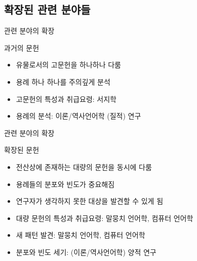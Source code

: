 \documentclass[11pt, aspectratio=169]{beamer}
\begin{document}
\subsection{확장된 관련 분야들}

\begin{frame}[t]{관련 분야의 확장}
  \begin{block}{과거의 문헌}
    \begin{itemize}
      \item 유물로서의 고문헌을 하나하나 다룸
      \item 용례 하나 하나를 주의깊게 분석
    \end{itemize}
  \end{block}
  \begin{itemize}
    \item 고문헌의 특성과 취급요령: 서지학
    \item 용례의 분석: 이론/역사언어학 (질적) 연구
  \end{itemize}
\end{frame}

\begin{frame}[t]{관련 분야의 확장}
  \begin{block}{확장된 문헌}
    \begin{itemize}
      \item 전산상에 존재하는 대량의 문헌을 동시에 다룸
      \item 용례들의 분포와 빈도가 중요해짐
      \item 연구자가 생각하지 못한 대상을 발견할 수 있게 됨
    \end{itemize}
  \end{block}
  \begin{itemize}
    \item 대량 문헌의 특성과 취급요령: 말뭉치 언어학, 컴퓨터 언어학
    \item 새 패턴 발견: 말뭉치 언어학, 컴퓨터 언어학
    \item 분포와 빈도 세기: (이론/역사언어학) 양적 연구
  \end{itemize}

\end{frame}
\end{document}
